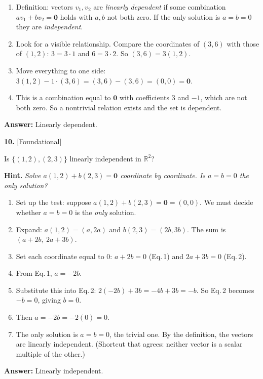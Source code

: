 \documentclass[11pt]{article}
\begin{document}
\begin{tcolorbox}[breakable,colback=ans,colframe=ansb,boxrule=0.5pt,left=4pt,right=4pt,top=2pt,bottom=2pt]\begin{enumerate}[leftmargin=2.2em,itemsep=1pt,topsep=1pt,label=\textbf{Step \arabic*.}]\item Definition: vectors $v_1,v_2$ are \emph{linearly dependent} if some combination $a v_1+b v_2=\mathbf 0$ holds with $a,b$ not both zero. If the only solution is $a=b=0$ they are \emph{independent}.
\item Look for a visible relationship. Compare the coordinates of $(3,6)$ with those of $(1,2)$: $3=3\cdot1$ and $6=3\cdot2$. So $(3,6)=3(1,2)$.
\item Move everything to one side: $3(1,2)-1\cdot(3,6)=(3,6)-(3,6)=(0,0)=\mathbf 0$.
\item This is a combination equal to $\mathbf 0$ with coefficients $3$ and $-1$, which are not both zero. So a nontrivial relation exists and the set is dependent.
\end{enumerate}\textbf{Answer:} Linearly dependent.\end{tcolorbox}
\par\vspace{2pt}
\begin{minipage}{\linewidth}\textbf{10.} \hfill{\scriptsize\color{ink}[Foundational]}\par\nopagebreak Is $\{(1,2),(2,3)\}$ linearly independent in $\mathbb{R}^{2}$?
\par\smallskip\begingroup\small\color{ink}\textbf{Hint.} \textit{Solve $a(1,2)+b(2,3)=\mathbf 0$ coordinate by coordinate. Is $a=b=0$ the only solution?}\endgroup
\end{minipage}\par\nopagebreak
\begin{tcolorbox}[breakable,colback=ans,colframe=ansb,boxrule=0.5pt,left=4pt,right=4pt,top=2pt,bottom=2pt]\begin{enumerate}[leftmargin=2.2em,itemsep=1pt,topsep=1pt,label=\textbf{Step \arabic*.}]\item Set up the test: suppose $a(1,2)+b(2,3)=\mathbf 0=(0,0)$. We must decide whether $a=b=0$ is the \emph{only} solution.
\item Expand: $a(1,2)=(a,2a)$ and $b(2,3)=(2b,3b)$. The sum is $(a+2b,\ 2a+3b)$.
\item Set each coordinate equal to $0$: $a+2b=0$ \quad (Eq.\,1) and \quad $2a+3b=0$ \quad (Eq.\,2).
\item From Eq.\,1, $a=-2b$.
\item Substitute this into Eq.\,2: $2(-2b)+3b=-4b+3b=-b$. So Eq.\,2 becomes $-b=0$, giving $b=0$.
\item Then $a=-2b=-2(0)=0$.
\item The only solution is $a=b=0$, the trivial one. By the definition, the vectors are linearly independent. (Shortcut that agrees: neither vector is a scalar multiple of the other.)
\end{enumerate}\textbf{Answer:} Linearly independent.\end{tcolorbox}
\end{document}
